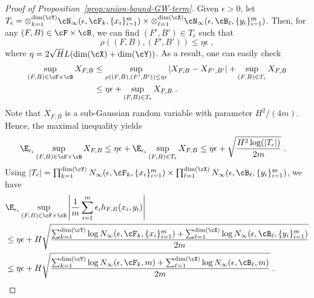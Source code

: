\documentclass[11pt]{article}
\begin{document}
\begin{proof}[Proof of Proposition~\ref{prop:union-bound-GW-term}]
	Given $\epsilon > 0$, let $T_{\epsilon} = \otimes_{k = 1}^{\mathrm{dim}(\cY)} \cN_\infty(\epsilon, \cF_k, \{x_i\}_{i=1}^{m}) \times \otimes_{\ell = 1}^{\mathrm{dim}(\cX)} \cN_\infty(\epsilon, \cB_\ell, \{y_i\}_{i=1}^{m})$. Then, for any $(F, B) \in \cF \times \cB$, we can find $(F', B') \in T_{\epsilon}$ such that 
	\begin{equation*}
		\rho((F, B), (F', B')) \le \eta \epsilon \;,
	\end{equation*}
	where $\eta = 2 \sqrt{H} L (\mathrm{dim}(\cX) + \mathrm{dim}(\cY))$. As a result, one can easily check
	\begin{equation*}
		\begin{split}
			\sup_{(F, B) \in \cF \times \cB} X_{F, B}
			& \le \sup_{\rho((F, B), (F', B')) \le \eta \epsilon} |X_{F, B} - X_{F', B'}| + \sup_{(F, B) \in T_\epsilon} X_{F, B} \\
			& \le \eta \epsilon + \sup_{(F, B) \in T_\epsilon} X_{F, B}\;.
		\end{split}
	\end{equation*}
	Note that $X_{F, B}$ is a sub-Gaussian random variable with parameter $H^2 / (4 m)$. Hence, the maximal inequality yields
	\begin{equation*}
		\begin{split}
			\E_{\epsilon_i} \sup_{(F, B) \in \cF \times \cB} X_{F, B}
			& \le \eta \epsilon + \E_{\epsilon_i} \sup_{(F, B) \in T_\epsilon} X_{F, B}
			\le \eta \epsilon + \sqrt{\frac{H^2 \log(|T_\epsilon|)}{2 m}}
			\;.
		\end{split}
	\end{equation*}
	Using $|T_\epsilon| = \prod_{k = 1}^{\mathrm{dim}(\cY)} N_{\infty}(\epsilon, \cF_k, \{x_i\}_{i=1}^{m}) \times \prod_{\ell = 1}^{\mathrm{dim}(\cX)} N_\infty(\epsilon, \cB_\ell, \{y_i\}_{i=1}^{m})$, we have
	\begin{equation*}
		\begin{split}
			& \E_{\epsilon_i} \sup_{(F, B) \in \cF \times \cB} \left|\frac{1}{m} \sum_{i=1}^{m} \epsilon_i h_{F, B}(x_i, y_i) \right| \\
			& \le 
			\eta \epsilon +  H \sqrt{\frac{\sum_{k = 1}^{\mathrm{dim}(\cY)} \log N_{\infty}(\epsilon, \cF_k, \{x_i\}_{i=1}^{m}) + \sum_{\ell = 1}^{\mathrm{dim}(\cX)} \log N_{\infty}(\epsilon, \cB_\ell, \{y_i\}_{i=1}^{m})}{2 m}} \\
			& \le \eta \epsilon +  H \sqrt{\frac{\sum_{k = 1}^{\mathrm{dim}(\cY)} \log N_{\infty}(\epsilon, \cF_k, m) + \sum_{\ell = 1}^{\mathrm{dim}(\cX)} \log N_{\infty}(\epsilon, \cB_\ell, m)}{2 m}} \;.

\end{split}
\end{equation*}
\end{proof}
\end{document}
